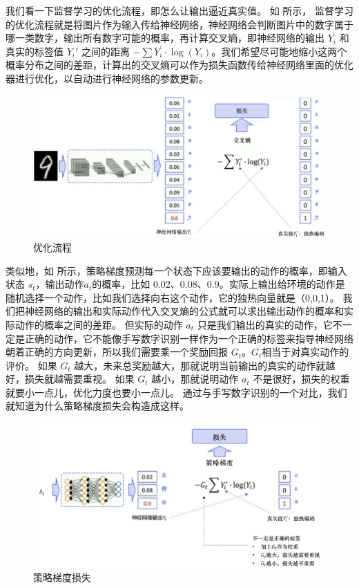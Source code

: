 我们看一下监督学习的优化流程，即怎么让输出逼近真实值。
如 所示，
监督学习的优化流程就是将图片作为输入传给神经网络，神经网络会判断图片中的数字属于哪一类数字，输出所有数字可能的概率，再计算交叉熵，即神经网络的输出 $Y_i$ 和真实的标签值 $Y_i'$ 之间的距离 $-\sum Y_{i}^{\prime} \cdot \log \left(Y_{i}\right)$。我们希望尽可能地缩小这两个概率分布之间的差距，计算出的交叉熵可以作为损失函数传给神经网络里面的优化器进行优化，以自动进行神经网络的参数更新。
\begin{figure}[hbt]
    \centering
    \includegraphics[width=0.5\linewidth]{ch6/figs/opti_process.png}
    \caption{优化流程}
    \label{fig:opti_process}
\end{figure}

类似地，如 所示，策略梯度预测每一个状态下应该要输出的动作的概率，即输入状态 $s_t$，输出动作$a_t$的概率，比如 0.02、0.08、0.9。实际上输出给环境的动作是随机选择一个动作，比如我们选择向右这个动作，它的独热向量就是（0,0,1）。
我们把神经网络的输出和实际动作代入交叉熵的公式就可以求出输出动作的概率和实际动作的概率之间的差距。
但实际的动作 $a_t$ 只是我们输出的真实的动作，它不一定是正确的动作，它不能像手写数字识别一样作为一个正确的标签来指导神经网络朝着正确的方向更新，所以我们需要乘一个奖励回报 $G_t$。$G_t$相当于对真实动作的评价。
如果 $G_t$ 越大，未来总奖励越大，那就说明当前输出的真实的动作就越好，损失就越需要重视。
如果 $G_t$ 越小，那就说明动作 $a_t$ 不是很好，损失的权重就要小一点儿，优化力度也要小一点儿。
通过与手写数字识别的一个对比，我们就知道为什么策略梯度损失会构造成这样。
\begin{figure}[hbt]
    \centering
    \includegraphics[width=0.5\linewidth]{ch6/figs/pg_loss.png}
    \caption{策略梯度损失}
    \label{fig:pg_loss}
\end{figure}

